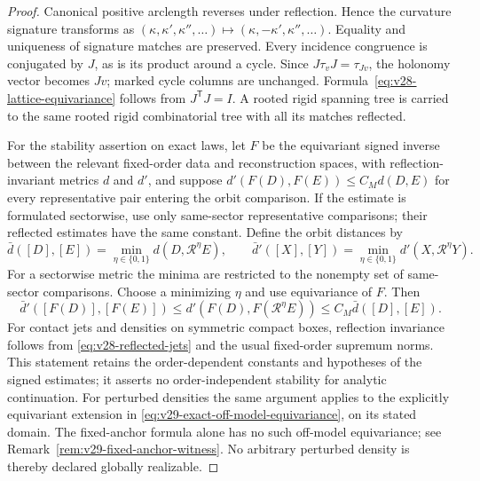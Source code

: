 \begin{proof}
Canonical positive arclength reverses under reflection.  Hence the curvature
signature transforms as
\( (\kappa,\kappa',\kappa'',\ldots)
\mapsto(\kappa,-\kappa',\kappa'',\ldots)\).
Equality and uniqueness of signature matches are preserved.  Every incidence
congruence is conjugated by \(J\), as is its product around a cycle.  Since
\(J\tau_vJ=\tau_{Jv}\), the holonomy vector becomes \(Jv\); marked cycle
columns are unchanged.  Formula~\eqref{eq:v28-lattice-equivariance} follows
from \(J^{\mathsf T}J=I\).  A rooted rigid spanning tree is carried to the
same rooted rigid combinatorial tree with all its matches reflected.

For the stability assertion on exact laws, let \(F\) be the equivariant
signed inverse between the relevant fixed-order data and reconstruction
spaces, with reflection-invariant
metrics \(d\) and \(d'\), and suppose
\(d'(F(D),F(E))\le C_Md(D,E)\) for every representative pair entering the orbit comparison.
If the estimate is formulated sectorwise, use only same-sector
representative comparisons; their reflected estimates have the same constant.
Define the orbit distances by
\[
 \bar d([D],[E])=\min_{\eta\in\{0,1\}}d(D,\mathscr R^\eta E),
 \qquad
 \bar d'([X],[Y])=\min_{\eta\in\{0,1\}}d'(X,\mathscr R^\eta Y).
\]
For a sectorwise metric the minima are restricted to the nonempty set of
same-sector comparisons.  Choose a minimizing \(\eta\) and use equivariance
of \(F\).  Then
\[
 \bar d'([F(D)],[F(E)])
 \le d'(F(D),F(\mathscr R^\eta E))
 \le C_M\bar d([D],[E]).
\]
For contact jets and densities on symmetric compact boxes, reflection
invariance follows from \eqref{eq:v28-reflected-jets} and the usual
fixed-order supremum norms.  This statement retains the order-dependent
constants and hypotheses of the signed estimates; it asserts no
order-independent stability for analytic continuation.  For perturbed
densities the same argument applies to the explicitly equivariant extension
in \eqref{eq:v29-exact-off-model-equivariance}, on its stated domain.  The
fixed-anchor formula alone has no such off-model equivariance; see
Remark~\ref{rem:v29-fixed-anchor-witness}.  No arbitrary perturbed density
is thereby declared globally realizable.
\end{proof}

